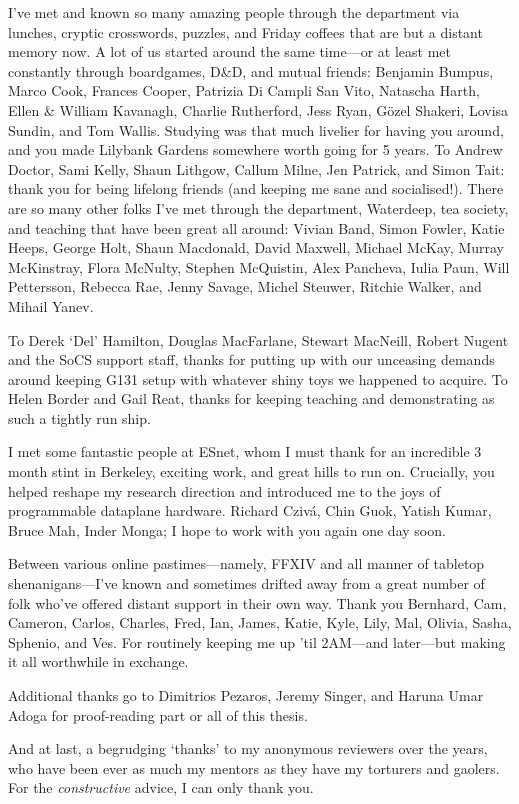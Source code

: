 I've met and known so many amazing people through the department via lunches, cryptic crosswords, puzzles, and Friday coffees that are but a distant memory now.
A lot of us started around the same time---or at least met constantly through boardgames, D\&D, and mutual friends: Benjamin Bumpus, Marco Cook, Frances Cooper, Patrizia Di Campli San Vito, Natascha Harth, Ellen \& William Kavanagh, Charlie Rutherford, Jess Ryan, G\"{o}zel Shakeri, Lovisa Sundin, and Tom Wallis.
Studying was that much livelier for having you around, and you made Lilybank Gardens somewhere worth going for 5 years.
To Andrew Doctor, Sami Kelly, Shaun Lithgow, Callum Milne, Jen Patrick, and Simon Tait: thank you for being lifelong friends (and keeping me sane and socialised!).
There are so many other folks I've met through the department, Waterdeep, tea society, and teaching that have been great all around: Vivian Band, Simon Fowler, Katie Heeps, George Holt, Shaun Macdonald, David Maxwell, Michael McKay, Murray McKinstray, Flora McNulty, Stephen McQuistin, Alex Pancheva, Iulia Paun, Will Pettersson, Rebecca Rae, Jenny Savage, Michel Steuwer, Ritchie Walker, and Mihail Yanev.

To Derek `Del' Hamilton, Douglas MacFarlane, Stewart MacNeill, Robert Nugent and the SoCS support staff, thanks for putting up with our unceasing demands around keeping G131 setup with whatever shiny toys we happened to acquire.
To Helen Border and Gail Reat, thanks for keeping teaching and demonstrating as such a tightly run ship.

I met some fantastic people at ESnet, whom I must thank for an incredible 3 month stint in Berkeley, exciting work, and great hills to run on.
Crucially, you helped reshape my research direction and introduced me to the joys of programmable dataplane hardware.
Richard Cziv\'{a}, Chin Guok, Yatish Kumar, Bruce Mah, Inder Monga; I hope to work with you again one day soon.

Between various online pastimes---namely, FFXIV and all manner of tabletop shenanigans---I've known and sometimes drifted away from a great number of folk who've offered distant support in their own way.
Thank you Bernhard, Cam, Cameron, Carlos, Charles, Fred, Ian, James, Katie, Kyle, Lily, Mal, Olivia, Sasha, Sphenio, and Ves.
For routinely keeping me up 'til 2AM---and later---but making it all worthwhile in exchange.

Additional thanks go to Dimitrios Pezaros, Jeremy Singer, and Haruna Umar Adoga for proof-reading part or all of this thesis.

And at last, a begrudging `thanks' to my anonymous reviewers over the years, who have been ever as much my mentors as they have my torturers and gaolers.
For the \emph{constructive} advice, I can only thank you.
